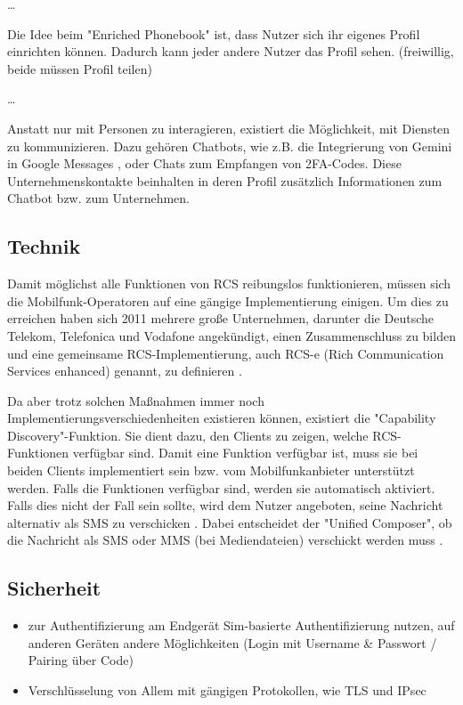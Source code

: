 \documentclass[conference]{IEEEtran}
\begin{document}
\cite{uniprof}

\dots

Die Idee beim "Enriched Phonebook" ist, dass Nutzer sich ihr eigenes Profil einrichten können.
Dadurch kann jeder andere Nutzer das Profil sehen.
(freiwillig, beide müssen Profil teilen)

\cite{rcsuite}

\dots

Anstatt nur mit Personen zu interagieren, existiert die Möglichkeit, mit Diensten zu kommunizieren. Dazu gehören Chatbots, wie z.B. die Integrierung von Gemini in Google Messages \cite{geminiinteg}, oder Chats zum Empfangen von 2FA-Codes. Diese Unternehmenskontakte beinhalten in deren Profil zusätzlich Informationen zum Chatbot bzw. zum Unternehmen.

\cite{uniprof}


\subsection{Technik}

Damit möglichst alle Funktionen von RCS reibungslos funktionieren, müssen sich die Mobilfunk-Operatoren auf eine gängige Implementierung einigen.
Um dies zu erreichen haben sich 2011 mehrere große Unternehmen, darunter die Deutsche Telekom, Telefonica und Vodafone angekündigt, einen Zusammenschluss zu bilden und eine gemeinsame RCS-Implementierung, auch RCS-e (Rich Communication Services enhanced) genannt, zu definieren \cite{rcsmno}.

Da aber trotz solchen Maßnahmen immer noch Implementierungsverschiedenheiten existieren können, existiert die "Capability Discovery"-Funktion.
Sie dient dazu, den Clients zu zeigen, welche RCS-Funktionen verfügbar sind.
Damit eine Funktion verfügbar ist, muss sie bei beiden Clients implementiert sein bzw. vom Mobilfunkanbieter unterstützt werden.
Falls die Funktionen verfügbar sind, werden sie automatisch aktiviert.
Falls dies nicht der Fall sein sollte, wird dem Nutzer angeboten, seine Nachricht alternativ als SMS zu verschicken \cite{uniprof}.
Dabei entscheidet der "Unified Composer", ob die Nachricht als SMS oder MMS (bei Mediendateien) verschickt werden muss \cite{rcsuite}.


\subsection{Sicherheit}

\begin{itemize}
    \item zur Authentifizierung am Endgerät Sim-basierte Authentifizierung nutzen, auf anderen Geräten andere Möglichkeiten (Login mit Username \& Passwort / Pairing über Code)
    \item Verschlüsselung von Allem mit gängigen Protokollen, wie TLS und IPsec
\end{itemize}
\cite{uniprof}
\end{document}

